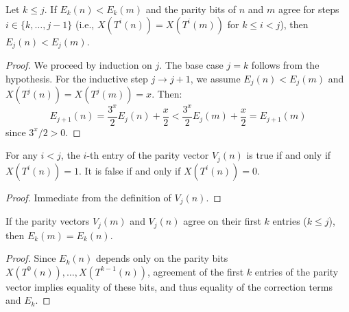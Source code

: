\begin{lemma}\label{lemma:E_suffix_preserves_lt}\leanok
Let $k \le j$. If $E_k(n) < E_k(m)$ and the parity bits of $n$ and $m$ agree for steps $i \in \{k, \dots, j-1\}$ (i.e., $X(T^i(n)) = X(T^i(m))$ for $k \le i < j$), then $E_j(n) < E_j(m)$.
\end{lemma}
\begin{proof}\leanok
We proceed by induction on $j$. The base case $j=k$ follows from the hypothesis. For the inductive step $j \to j+1$, we assume $E_j(n) < E_j(m)$ and $X(T^j(n)) = X(T^j(m)) = x$. Then:
\begin{equation}
    E_{j+1}(n) = \frac{3^x}{2} E_j(n) + \frac{x}{2} < \frac{3^x}{2} E_j(m) + \frac{x}{2} = E_{j+1}(m)
\end{equation}
since $3^x/2 > 0$.
\end{proof}

\begin{lemma}\label{lemma:X_of_V_true_false}\leanok
For any $i < j$, the $i$-th entry of the parity vector $V_j(n)$ is true if and only if $X(T^i(n)) = 1$. It is false if and only if $X(T^i(n)) = 0$.
\end{lemma}
\begin{proof}\leanok
Immediate from the definition of $V_j(n)$.
\end{proof}

\begin{lemma}\label{lemma:E_eq_of_V_prefix_eq}\leanok
If the parity vectors $V_j(m)$ and $V_j(n)$ agree on their first $k$ entries ($k \le j$), then $E_k(m) = E_k(n)$.
\end{lemma}
\begin{proof}\leanok
Since $E_k(n)$ depends only on the parity bits $X(T^0(n)), \dots, X(T^{k-1}(n))$, agreement of the first $k$ entries of the parity vector implies equality of these bits, and thus equality of the correction terms and $E_k$.
\end{proof}

